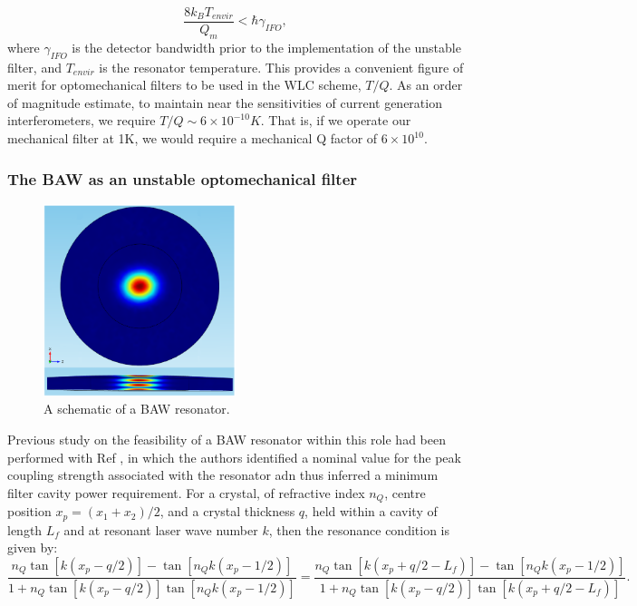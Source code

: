 \documentclass[aps,  
                a4paper, 
                amsmath, 
                amssymb, 
                preprint,
                tightenlines,  
                amsfonts,
                nofootinbib,
                onecolumn,
                titlepage,
                10pt
            ]{revtex4-2}
\begin{document}
    \begin{equation}
        \label{eq:thermal-noise}
        \frac{8k_BT_{envir}}{Q_m}<\hbar\gamma_{IFO},
    \end{equation}
    where $\gamma_{IFO}$ is the detector bandwidth prior to the implementation of the unstable filter, and $T_{envir}$ is the resonator temperature. This provides a convenient figure of merit for optomechanical filters to be used in the WLC scheme, $T/Q$. As an order of magnitude estimate, to maintain near the sensitivities of current generation interferometers, we require $T/Q\sim6\times10^{-10}K$. That is, if we operate our mechanical filter at 1K, we would require a mechanical Q factor of $6\times10^{10}$. 

    \subsubsection*{The BAW as an unstable optomechanical filter}
    \begin{figure}
        \centering
        \includegraphics[width=0.5\textwidth]{img/baw.png}
        \caption{A schematic of a BAW resonator\cite{galliou2016}.}
        \label{fig:baw}
    \end{figure}
    Previous study on the feasibility of a BAW resonator within this role had been performed with Ref \cite{page2021}, in which the authors identified a nominal value for the peak coupling strength associated with the resonator adn thus inferred a minimum filter cavity power requirement. For a crystal, of refractive index $n_Q$, centre position $x_p=(x_1+x_2)/2$, and a crystal thickness $q$, held within a cavity of length $L_f$ and at resonant laser wave number $k$, then the resonance condition is given by:
    \begin{equation}
        \label{eq:page-BAW-resonance-condition}
        \frac{n_Q\tan[k(x_p-q/2)]-\tan[n_Qk(x_p-1/2)]}{1+n_Q\tan[k(x_p-q/2)]\tan[n_Qk(x_p-1/2)]}=\frac{n_Q\tan[k(x_p+q/2-L_f)]-\tan[n_Qk(x_p-1/2)]}{1+n_Q\tan[k(x_p-q/2)]\tan[k(x_p+q/2-L_f)]}.
    \end{equation}
\end{document}
